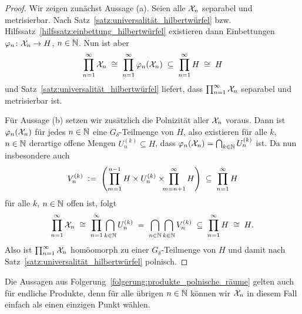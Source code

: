 \documentclass[../thesis/thesis.tex]{subfiles}
\begin{document}
	\begin{proof}
		Wir zeigen zunächst Aussage (a). Seien alle $\mathcal{X}_n$ separabel und metrisierbar. Nach Satz~\ref{satz:universalität_hilbertwürfel} bzw. 
		Hilfssatz~\ref{hilfssatz:einbettung_hilbertwürfel} existieren dann Einbettungen $\varphi_n \colon \mathcal{X}_n \to H$, $n \in \mathbb{N}$. Nun ist aber 
		\[ \prod_{n=1}^{\infty} \mathcal{X}_n \; \cong \; \prod_{n=1}^{\infty} \varphi_n(\mathcal{X}_n) \; \subseteq \; \prod_{n=1}^{\infty} H \; \cong \; H \]
		und Satz~\ref{satz:universalität_hilbertwürfel} liefert, dass $\prod_{n=1}^{\infty} \mathcal{X}_n$ separabel und metrisierbar ist.
		
		Für Aussage (b) setzen wir zusätzlich die Polnizität aller $\mathcal{X}_n$ voraus. Dann ist $\varphi_n(\mathcal{X}_n)$ für jedes $n \in \mathbb{N}$ eine $G_{\delta}$-Teilmenge von $H$, also
		existieren für alle $k$, $n \in \mathbb{N}$ derartige offene Mengen $U_n^{(k)} \subseteq H$, dass $\varphi_n(\mathcal{X}_n) = \bigcap_{k \in \mathbb{N}} U_n^{(k)}$ ist. Da nun insbesondere auch
		\[ V_n^{(k)} \; \vcentcolon = \; \left( \prod_{m=1}^{n-1} H \times U_n^{(k)} \times \!\!\! \prod_{m=n+1}^{\infty} H \right) \; \subseteq \; \prod_{n=1}^{\infty} H \]
		für alle $k$, $n \in \mathbb{N}$ offen ist, folgt
		\[ \prod_{n=1}^{\infty} \mathcal{X}_n \; \cong \; \prod_{n=1}^{\infty} \bigcap_{k \in \mathbb{N}} U_n^{(k)} \; = \; \bigcap_{n \in \mathbb{N}} \bigcap_{k \in \mathbb{N}} V_n^{(k)} \; \subseteq \; \prod_{n=1}^{\infty} H \; \cong \; H \text{.} \]
		Also ist $\prod_{n=1}^{\infty} \mathcal{X}_n$ homöomorph zu einer $G_{\delta}$-Teilmenge von $H$ und damit nach Satz~\ref{satz:universalität_hilbertwürfel} polnisch.
	\end{proof}
	
	\begin{Bemerkung}
		Die Aussagen aus Folgerung~\ref{folgerung:produkte_polnische_räume} gelten auch für endliche Produkte, denn für alle übrigen $n \in \mathbb{N}$ können wir $\mathcal{X}_n$ in diesem Fall einfach als einen einzigen Punkt wählen.
	\end{Bemerkung}
	
\end{document}
